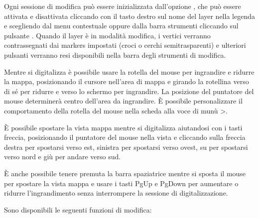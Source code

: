 Ogni sessione di modifica può essere inizializzata dall'opzione
, che può
essere attivata e disattivata cliccando con il tasto destro sul nome del layer nella legenda e scegliendo dal menu contestuale  oppure
dalla barra strumenti cliccando sul pulsante 
. Quando il layer è in modalità modifica, i
vertici verranno contrassegnati dai markers impostati (croci o cerchi
semitrasparenti) e ulteriori pulsanti verranno resi disponibili nella barra
degli strumenti di modifica.


Mentre si digitalizza è possibile usare la rotella del mouse per ingrandire e
ridurre la mappa, posizionando il cursore nell'area di mappa e girando la
rotellina verso di sé per ridurre e verso lo schermo per ingrandire. La
posizione del puntatore del mouse determinerà centro dell'area da
ingrandire. È possibile personalizzare il comportamento della rotella del
mouse nella scheda  alla voce di munù  
>.


È possibile spostare la vista mappa mentre si digitalizza aiutandosi con i
tasti freccia, posizionando il puntatore del mouse nella vista e cliccando
sulla freccia destra per spostarsi verso est, sinistra per spostarsi verso ovest,
su per spostarsi verso nord e giù per andare verso sud.

È anche possibile tenere premuta la barra spaziatrice mentre si sposta il
mouse per spostare la vista mappa e usare i tasti PgUp e PgDown per aumentare
o ridurre l'ingrandimento senza interrompere la sessione di digitalizzazione.

Sono disponibili le seguenti funzioni di modifica:

